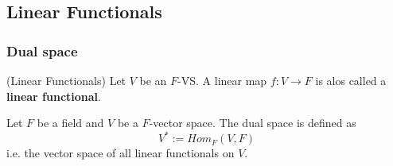 \subsection{Linear Functionals}
\subsubsection{Dual space}

\begin{definition}
(Linear Functionals) Let $V$ be an $F$-VS. A linear map $f : V \to F$ is alos called a \textbf{linear functional}. 
\end{definition}

\begin{definition}
    Let $F$ be a field and $V$ be a $F$-vector space. The dual space is defined as
    \[
        V^* := Hom_F (V, F)
    \]
    i.e. the vector space of all linear functionals on $V$. 
\end{definition}

